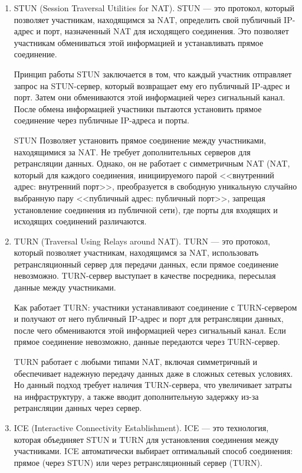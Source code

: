 \begin{enumerate}
  \item STUN (Session Traversal Utilities for NAT).
  STUN --- это протокол, который позволяет участникам, находящимся за NAT, определить свой публичный IP-адрес и порт, назначенный NAT для исходящего соединения.
  Это позволяет участникам обмениваться этой информацией и устанавливать прямое соединение.
  
  Принцип работы STUN заключается в том, что каждый участник отправляет запрос на STUN-сервер, который возвращает ему его публичный IP-адрес и порт.
  Затем они обмениваются этой информацией через сигнальный канал.
  После обмена информацией участники пытаются установить прямое соединение через публичные IP-адреса и порты.
  
  STUN Позволяет установить прямое соединение между участниками, находящимися за NAT.
  Не требует дополнительных серверов для ретрансляции данных.
  Однако, он не работает с симметричным NAT (NAT, который для каждого соединения, инициируемого парой <<внутренний адрес: внутренний порт>>, преобразуется в свободную уникальную случайно выбранную пару <<публичный адрес: публичный порт>>, запрещая установление соединения из публичной сети), где порты для входящих и исходящих соединений различаются.
  
  \item TURN (Traversal Using Relays around NAT).
  TURN --- это протокол, который позволяет участникам, находящимся за NAT, использовать ретрансляционный сервер для передачи данных, если прямое соединение невозможно.
  TURN-сервер выступает в качестве посредника, пересылая данные между участниками.
  
  Как работает TURN: участники устанавливают соединение с TURN-сервером и получают от него публичный IP-адрес и порт для ретрансляции данных, после чего обмениваются этой информацией через сигнальный канал.
  Если прямое соединение невозможно, данные передаются через TURN-сервер.
  
  TURN работает с любыми типами NAT, включая симметричный и обеспечивает надежную передачу данных даже в сложных сетевых условиях.
  Но данный подход требует наличия TURN-сервера, что увеличивает затраты на инфраструктуру, а также вводит дополнительную задержку из-за ретрансляции данных через сервер.
  
  \item ICE (Interactive Connectivity Establishment).
  ICE --- это технология, которая объединяет STUN и TURN для установления соединения между участниками.
  ICE автоматически выбирает оптимальный способ соединения: прямое (через STUN) или через ретрансляционный сервер (TURN).
  

\end{enumerate}
